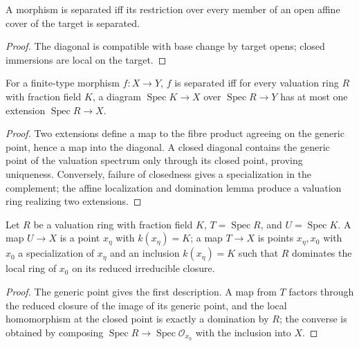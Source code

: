 \begin{corollary}
\label{cor:II-4-2}
A morphism is separated iff its restriction over every member of an open affine cover of the target is
separated.
\end{corollary}
\begin{proof}
The diagonal is compatible with base change by target opens; closed immersions are local on the target.
\end{proof}

\begin{theorem}
\label{thm:II-4-3}
For a finite-type morphism $f:X\to Y$, $f$ is separated iff for every valuation ring $R$ with fraction field $K$,
a diagram $\operatorname{Spec}K\to X$ over $\operatorname{Spec}R\to Y$ has at most one extension
$\operatorname{Spec}R\to X$.
\end{theorem}
\begin{proof}
Two extensions define a map to the fibre product agreeing on the generic point, hence a map into the
diagonal. A closed diagonal contains the generic point of the valuation spectrum only through its
closed point, proving uniqueness. Conversely, failure of closedness gives a specialization in the
complement; the affine localization and domination lemma produce a valuation ring realizing two
extensions.
\end{proof}

\begin{lemma}
\label{lem:II-4-4}
Let $R$ be a valuation ring with fraction field $K$, $T=\operatorname{Spec}R$, and
$U=\operatorname{Spec}K$. A map $U\to X$ is a point $x_\eta$ with $k(x_\eta)=K$; a map
$T\to X$ is points $x_\eta,x_0$ with $x_0$ a specialization of $x_\eta$ and an inclusion
$k(x_\eta)=K$ such that $R$ dominates the local ring of $x_0$ on its reduced irreducible closure.
\end{lemma}
\begin{proof}
The generic point gives the first description. A map from $T$ factors through the reduced closure
of the image of its generic point, and the local homomorphism at the closed point is exactly a
domination by $R$; the converse is obtained by composing $\operatorname{Spec}R\to
\operatorname{Spec}\mathcal O_{x_0}$ with the inclusion into $X$.
\end{proof}

